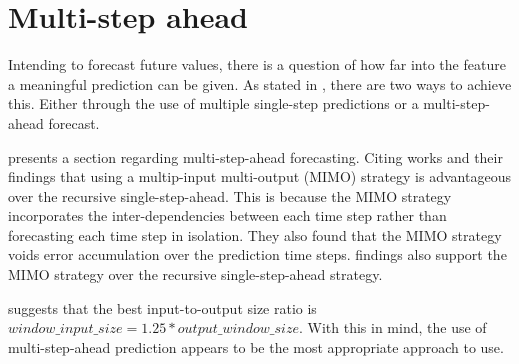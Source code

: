 \section{Multi-step ahead}
\label{section:RelatedWork:multi-step-ahead}
Intending to forecast future values, there is a question of how far into the feature a meaningful prediction can be given.
As stated in , there are two ways to achieve this. 
Either through the use of multiple single-step predictions or a multi-step-ahead forecast.

\cite{Hewamalage2021} presents a section regarding multi-step-ahead forecasting.
Citing \cite{BenTaieb2011} works and their findings that using a multip-input multi-output (MIMO) strategy is
advantageous over the recursive single-step-ahead.
This is because the MIMO strategy incorporates the inter-dependencies between each time step rather than forecasting
each time step in isolation.
They also found that the MIMO strategy voids error
accumulation over the prediction time steps.
\cite{Ramos2015} findings also support the MIMO strategy over the recursive
single-step-ahead strategy.

\cite{Hewamalage2021} suggests that the best input-to-output size ratio
is $window\_input\_size = 1.25 * output\_window\_size$.
With this in mind, the use of multi-step-ahead prediction appears to be the most appropriate approach to use.